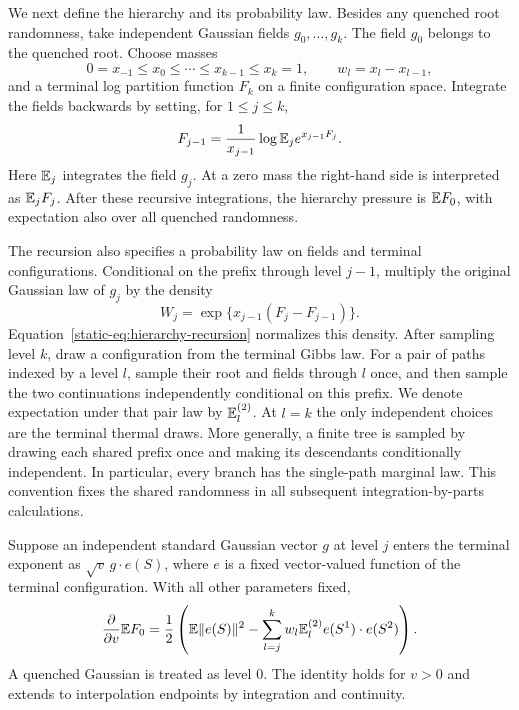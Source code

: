 We next define the hierarchy and its probability law. Besides any
quenched root randomness, take independent Gaussian fields
$g_0,\ldots,g_k$. The field $g_0$ belongs to the quenched root. Choose
masses
\[
 0=x_{-1}\le x_0\le\cdots\le x_{k-1}\le x_k=1,
 \qquad w_l=x_l-x_{l-1},
\]
and a terminal log partition function $F_k$ on a finite configuration
space. Integrate the fields backwards by setting, for $1\le j\le k$,
\begin{equation}\label{static-eq:hierarchy-recursion}
 F_{j-1}=\frac1{x_{j-1}}\log\mathbb E_j e^{x_{j-1}F_j}.
\end{equation}
Here $\mathbb E_j$ integrates the field $g_j$. At a zero mass the right-hand
side is interpreted as $\mathbb E_jF_j$. After these recursive integrations,
the hierarchy pressure is $\mathbb E F_0$, with expectation also over all
quenched randomness.

The recursion also specifies a probability law on fields and terminal
configurations. Conditional on the prefix through level $j-1$, multiply
the original Gaussian law of $g_j$ by the density
\begin{equation}\label{static-eq:hierarchy-tilt}
 W_j=\exp\{x_{j-1}(F_j-F_{j-1})\}.
\end{equation}
Equation~\eqref{static-eq:hierarchy-recursion} normalizes this density.
After sampling level $k$, draw a configuration from the terminal Gibbs
law. For a pair of paths indexed by a level $l$, sample their root and
fields through $l$ once, and then sample the two continuations
independently conditional on this prefix. We denote expectation under
that pair law by $\mathbb E_l^{(2)}$. At $l=k$ the only independent choices
are the terminal thermal draws. More generally, a finite tree is
sampled by drawing each shared prefix once and making its descendants
conditionally independent. In particular, every branch has the
single-path marginal law. This convention fixes the shared randomness
in all subsequent integration-by-parts calculations.

\begin{lemma}\label{static-lem:hierarchy-derivative}
Suppose an independent standard Gaussian vector $g$ at level $j$ enters the
terminal exponent as $\sqrt v\,g\cdot e(S)$, where $e$ is a fixed vector-valued
function of the terminal configuration.  With all other parameters fixed,
\begin{equation}\label{static-eq:hierarchy-derivative}
 \frac{\partial}{\partial v}\mathbb E F_0
 =\frac12\left(
 \mathbb E\|e(S)\|^2-
 \sum_{l=j}^k w_l\mathbb E_l^{(2)}e(S^1)\cdot e(S^2)
 \right).
\end{equation}
A quenched Gaussian is treated as level $0$.  The identity holds for
$v>0$ and extends to interpolation endpoints by integration and continuity.
\end{lemma}

